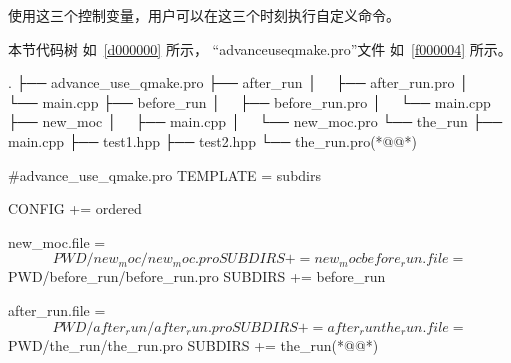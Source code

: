 使用这三个控制变量，用户可以在这三个时刻执行自定义命令。

本节代码树
如\treeindexnumbernameone\ \ref{d000000}
所示，
“advance\underline{\hspace{0.5em}}use\underline{\hspace{0.5em}}qmake.pro”文件
如\filesourcenumbernameone\ \ref{f000004}
所示。

{}\label{d000000}    %
\begin{thebookfilesourceonepathtree}[escapeinside={(*@}{@*)},
caption=GoodLuck,
numbers=none,
title=\treeindexnumbernameone \thetreeindexnumber
]
.
├── advance_use_qmake.pro
├── after_run
│   ├── after_run.pro
│   └── main.cpp
├── before_run
│   ├── before_run.pro
│   └── main.cpp
├── new_moc
│   ├── main.cpp
│   └── new_moc.pro
└── the_run
    ├── main.cpp
    ├── test1.hpp
    ├── test2.hpp
    └── the_run.pro(*@\marginpar[\hfill\setlength\fboxsep{2pt}\fbox{\footnotesize{\kaishu\parbox{1em}{\setlength{\baselineskip}{2pt}\treeindexnumbernameone}}\footnotesize{\thetreeindexnumber}}]{\setlength\fboxsep{2pt}\fbox{\footnotesize{\kaishu\parbox{1em}{\setlength{\baselineskip}{2pt}\treeindexnumbernameone}}\footnotesize{\thetreeindexnumber}}}@*)\end{thebookfilesourceonepathtree}          %
\addtocounter{lstlisting}{-1}   %

\label{f000004}    %
\FloatBarrier                                  %
\begin{thebookfilesourceone}[escapeinside={(*@}{@*)},
caption=GoodLuck,
title=\filesourcenumbernameone \thefilesourcenumber
]
#advance_use_qmake.pro
TEMPLATE = subdirs

CONFIG += ordered

new_moc.file = $$PWD/new_moc/new_moc.pro
SUBDIRS += new_moc

before_run.file = $$PWD/before_run/before_run.pro
SUBDIRS += before_run

after_run.file = $$PWD/after_run/after_run.pro
SUBDIRS += after_run

the_run.file = $$PWD/the_run/the_run.pro
SUBDIRS += the_run(*@\marginpar[\hfill\setlength\fboxsep{2pt}\fbox{\footnotesize{\kaishu\parbox{1em}{\setlength{\baselineskip}{2pt}\filesourcenumbernameone}}\footnotesize{\thefilesourcenumber}}]{\setlength\fboxsep{2pt}\fbox{\footnotesize{\kaishu\parbox{1em}{\setlength{\baselineskip}{2pt}\filesourcenumbernameone}}\footnotesize{\thefilesourcenumber}}}@*)\end{thebookfilesourceone}          %
\addtocounter{lstlisting}{-1}   %

